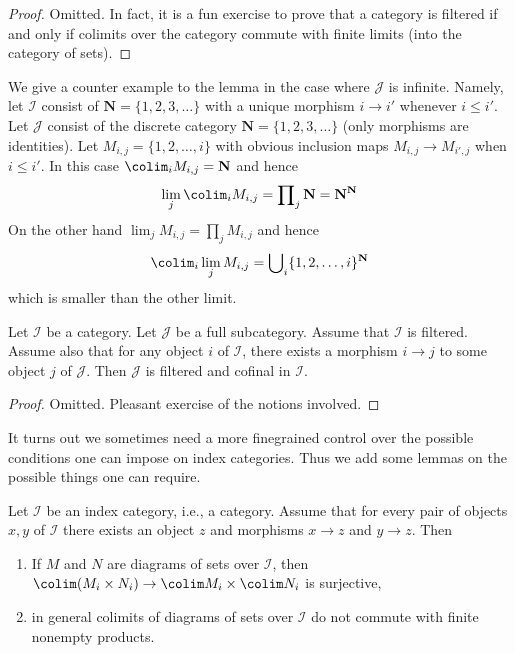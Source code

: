 \begin{proof}
Omitted. In fact, it is a fun exercise to prove that a category is
filtered if and only if colimits over the category commute with finite
limits (into the category of sets).
\end{proof}

\noindent
We give a counter example to the lemma in
the case where $\mathcal{J}$ is infinite. Namely, let
$\mathcal{I}$ consist of $\mathbf{N} = \{1, 2, 3, \ldots\}$
with a unique morphism $i \to i'$ whenever $i \leq i'$.
Let $\mathcal{J}$ consist of the discrete category
$\mathbf{N} = \{1, 2, 3, \ldots\}$ (only morphisms are identities).
Let $M_{i, j} = \{1, 2, \ldots, i\}$ with obvious inclusion maps
$M_{i, j} \to M_{i', j}$ when $i \leq i'$. In this case
$\colim_i M_{i, j} = \mathbf{N}$ and hence
$$
\lim_j \colim_i M_{i, j}
=
\prod\nolimits_j \mathbf{N}
=
\mathbf{N}^\mathbf{N}
$$
On the other hand $\lim_j M_{i, j} = \prod\nolimits_j M_{i, j}$ and
hence
$$
\colim_i \lim_j M_{i, j}
=
\bigcup\nolimits_i \{1, 2, \ldots, i\}^{\mathbf{N}}
$$
which is smaller than the other limit.

\begin{lemma}
\label{lemma-cofinal-in-filtered}
Let $\mathcal{I}$ be a category. Let $\mathcal{J}$ be a full subcategory.
Assume that $\mathcal{I}$ is filtered. Assume also that for any object
$i$ of $\mathcal{I}$, there exists a morphism $i \to j$
to some object $j$ of $\mathcal{J}$. Then $\mathcal{J}$
is filtered and cofinal in $\mathcal{I}$.
\end{lemma}

\begin{proof}
Omitted. Pleasant exercise of the notions involved.
\end{proof}

\noindent
It turns out we sometimes need a more finegrained control over the
possible conditions one can impose on index categories. Thus we add
some lemmas on the possible things one can require.

\begin{lemma}
\label{lemma-preserve-products}
Let $\mathcal{I}$ be an index category, i.e., a category. Assume
that for every pair of objects $x, y$ of $\mathcal{I}$
there exists an object $z$ and morphisms $x \to z$ and $y \to z$.
Then
\begin{enumerate}
\item If $M$ and $N$ are diagrams of sets over $\mathcal{I}$,
then $\colim (M_i \times N_i) \to \colim M_i \times \colim N_i$
is surjective,
\item in general colimits of diagrams of sets over $\mathcal{I}$
do not commute with finite nonempty products.
\end{enumerate}
\end{lemma}

